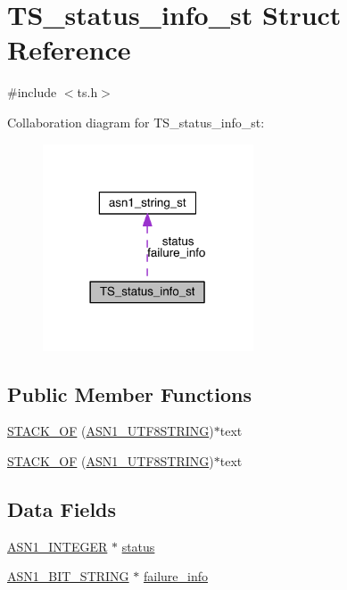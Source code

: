 \hypertarget{struct_t_s__status__info__st}{}\section{T\+S\+\_\+status\+\_\+info\+\_\+st Struct Reference}
\label{struct_t_s__status__info__st}


{\ttfamily \#include $<$ts.\+h$>$}



Collaboration diagram for T\+S\+\_\+status\+\_\+info\+\_\+st\+:\nopagebreak
\begin{figure}[H]
\begin{center}
\leavevmode
\includegraphics[width=177pt]{struct_t_s__status__info__st__coll__graph}
\end{center}
\end{figure}
\subsection*{Public Member Functions}
\begin{DoxyCompactItemize}
\item 
\hyperlink{struct_t_s__status__info__st_af7ed76a173172445ea714d8695c1e10e}{S\+T\+A\+C\+K\+\_\+\+OF} (\hyperlink{crypto_2ossl__typ_8h_ad7ed3ce45259147bc338c4849377d2bb}{A\+S\+N1\+\_\+\+U\+T\+F8\+S\+T\+R\+I\+NG})$\ast$text
\item 
\hyperlink{struct_t_s__status__info__st_af7ed76a173172445ea714d8695c1e10e}{S\+T\+A\+C\+K\+\_\+\+OF} (\hyperlink{crypto_2ossl__typ_8h_ad7ed3ce45259147bc338c4849377d2bb}{A\+S\+N1\+\_\+\+U\+T\+F8\+S\+T\+R\+I\+NG})$\ast$text
\end{DoxyCompactItemize}
\subsection*{Data Fields}
\begin{DoxyCompactItemize}
\item 
\hyperlink{crypto_2ossl__typ_8h_af4335399bf9774cb410a5e93de65998b}{A\+S\+N1\+\_\+\+I\+N\+T\+E\+G\+ER} $\ast$ \hyperlink{struct_t_s__status__info__st_a76846a32006dd80ad9ff79af5bbc0f8b}{status}
\item 
\hyperlink{crypto_2ossl__typ_8h_af837aaa00e151b1e8773aea5a8fe1cc4}{A\+S\+N1\+\_\+\+B\+I\+T\+\_\+\+S\+T\+R\+I\+NG} $\ast$ \hyperlink{struct_t_s__status__info__st_afcc4d40dbe7a8b9f9c52982289fcf813}{failure\+\_\+info}
\end{DoxyCompactItemize}



